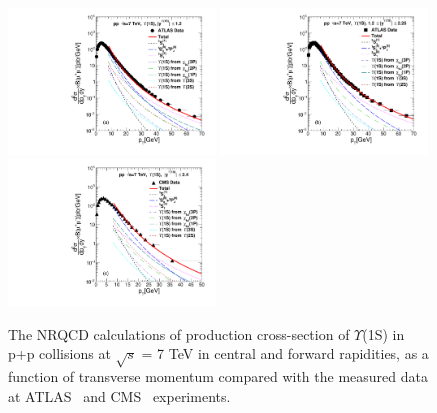 \documentclass[review]{elsarticle}
\begin{document}
\begin{figure}
  \centering
  \includegraphics[width=0.49\textwidth]{Figures/NRQCD_Beauty/Fig7a_ATLAS_D2NDPtDy_Y1S_Y1212_Pt.pdf}
  \includegraphics[width=0.49\textwidth]{Figures/NRQCD_Beauty/Fig7b_ATLAS_D2NDPtDy_Y1S_Y12225_Pt.pdf}
  \includegraphics[width=0.49\textwidth]{Figures/NRQCD_Beauty/Fig7c_CMS_D2NDPtDy_Y1S_Y0024_Pt.pdf}
  \caption{\small{The NRQCD calculations of production cross-section of $\Upsilon$(1S) in p+p collisions at 
      $\sqrt{s}$ = 7 TeV in central and forward rapidities, as a function of transverse momentum compared 
      with the measured data at ATLAS~\cite{Aad:2012dlq} and CMS~\cite{Chatrchyan:2013yna} experiments.}}
  \label{Fig:SigmaY1SATLAS7TEV}
\end{figure}
\end{document}

